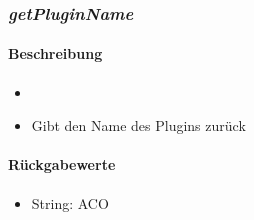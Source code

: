 \subsubsection*{\textit{getPluginName}}\label{getPluginName}
\paragraph{Beschreibung}
\begin{itemize}
	\item[]\noindent{}
	\item[] Gibt den Name des Plugins zurück
\end{itemize}
\paragraph{Rückgabewerte}
\begin{itemize}
	\item[] String: ACO
\end{itemize}